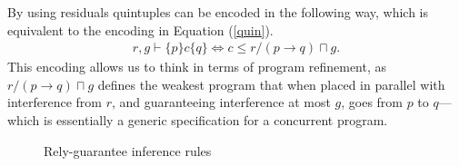 \documentclass{llncs}
\begin{document}
By using residuals quintuples can be encoded in the following way,
which is equivalent to the encoding in Equation (\ref{quin}).
\begin{align}
r, g \vdash \{p\} c \{q\} \iff c \le r/(p \rightarrow q) \sqcap g \label{refine}.
\end{align}
This encoding allows us to think in terms of program refinement, as
$r/(p \rightarrow q) \sqcap g$ defines the weakest program that when
placed in parallel with interference from $r$, and guaranteeing
interference at most $g$, goes from $p$ to $q$---which is essentially
a generic specification for a concurrent program.

\begin{figure}[tbh]
\centering
\begin{prooftree}
\end{prooftree}

\begin{prooftree}
\end{prooftree}

\begin{prooftree}
\end{prooftree}

\begin{prooftree}
\end{prooftree}

\begin{prooftree}
\end{prooftree}

\begin{prooftree}
\end{prooftree}
\caption{Rely-guarantee inference rules}
\label{fig:rgrules}
\end{figure}
\end{document}
